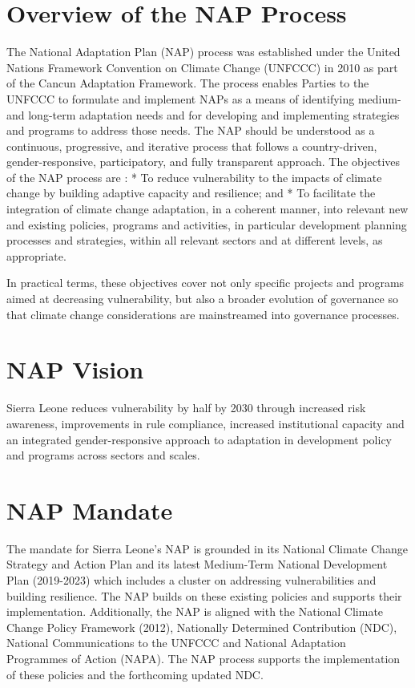 \documentclass[
]{book}
\begin{document}
\hypertarget{overview-of-the-nap-process}{%
\section{Overview of the NAP Process}\label{overview-of-the-nap-process}}

The National Adaptation Plan (NAP) process was established under the United Nations Framework Convention on Climate Change (UNFCCC) in 2010 as part of the Cancun Adaptation Framework. The process enables Parties to the UNFCCC to formulate and implement NAPs as a means of identifying medium- and long-term adaptation needs and for developing and implementing strategies and programs to address those needs. The NAP should be understood as a continuous, progressive, and iterative process that follows a country-driven, gender-responsive, participatory, and fully transparent approach. The objectives of the NAP process are :
* To reduce vulnerability to the impacts of climate change by building adaptive capacity and resilience; and
* To facilitate the integration of climate change adaptation, in a coherent manner, into relevant new and existing policies, programs and activities, in particular development planning processes and strategies, within all relevant sectors and at different levels, as appropriate.

In practical terms, these objectives cover not only specific projects and programs aimed at decreasing vulnerability, but also a broader evolution of governance so that climate change considerations are mainstreamed into governance processes.

\hypertarget{nap-vision}{%
\section{NAP Vision}\label{nap-vision}}

Sierra Leone reduces vulnerability by half by 2030 through increased risk awareness, improvements in rule compliance, increased institutional capacity and an integrated gender-responsive approach to adaptation in development policy and programs across sectors and scales.

\hypertarget{nap-mandate}{%
\section{NAP Mandate}\label{nap-mandate}}

The mandate for Sierra Leone's NAP is grounded in its National Climate Change Strategy and Action Plan and its latest Medium-Term National Development Plan (2019-2023) which includes a cluster on addressing vulnerabilities and building resilience. The NAP builds on these existing policies and supports their implementation. Additionally, the NAP is aligned with the National Climate Change Policy Framework (2012), Nationally Determined Contribution (NDC), National Communications to the UNFCCC and National Adaptation Programmes of Action (NAPA). The NAP process supports the implementation of these policies and the forthcoming updated NDC.
\end{document}
